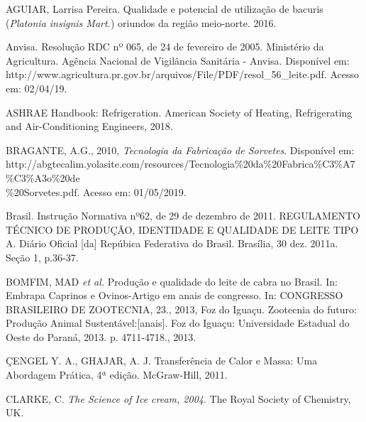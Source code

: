 \documentclass[10pt,a4paper]{article}
\begin{document}
\begin{landscape}

\end{landscape}

\begin{landscape}

\end{landscape}


\newpage

\begin{thebibliography}{}

 AGUIAR, Larrisa Pereira. Qualidade e potencial de utilização de bacuris (\textit{Platonia insignis Mart.}) oriundos da região meio-norte. 2016.

 Anvisa. Resolução RDC nº 065, de 24 de fevereiro de 2005. Ministério da Agricultura. Agência Nacional de Vigilância Sanitária - Anvisa. Disponível em:
http://www.agricultura.pr.gov.br/arquivos/File/PDF/resol\_56\_leite.pdf. Acesso em: 02/04/19.

 ASHRAE Handbook: Refrigeration. American Society of Heating, Refrigerating and Air-Conditioning Engineers, 2018.

 BRAGANTE, A.G., 2010, \textit{Tecnologia da Fabricação de Sorvetes}. Disponível em: http://abgtecalim.yolasite.com/resources/Tecnologia\%20da\%20Fabrica\%C3\%A7\%C3\%A3o\%20de\\
\%20Sorvetes.pdf. Acesso em: 01/05/2019.

 Brasil. Instrução Normativa nº62, de 29 de dezembro de 2011. REGULAMENTO TÉCNICO DE PRODUÇÃO, IDENTIDADE E QUALIDADE DE LEITE TIPO A. Diário Oficial [da] Repúbica Federativa do Brasil. Brasília, 30 dez. 2011a. Seção 1, p.36-37.

 BOMFIM, MAD \textit{et al.} Produção e qualidade do leite de cabra no Brasil. In: Embrapa Caprinos e Ovinos-Artigo em anais de congresso. In: CONGRESSO BRASILEIRO DE ZOOTECNIA, 23., 2013, Foz do Iguaçu. Zootecnia do futuro: Produção Animal Sustentável:[anais]. Foz do Iguaçu: Universidade Estadual do Oeste do Paraná, 2013. p. 4711-4718., 2013.

 ÇENGEL Y. A., GHAJAR, A. J. Transferência de Calor e Massa: Uma Abordagem Prática, 4ª edição. McGraw-Hill, 2011.

 CLARKE, C. \textit{The Science of Ice cream, 2004}. The Royal Society of Chemistry, UK.


\end{thebibliography}
\end{document}
